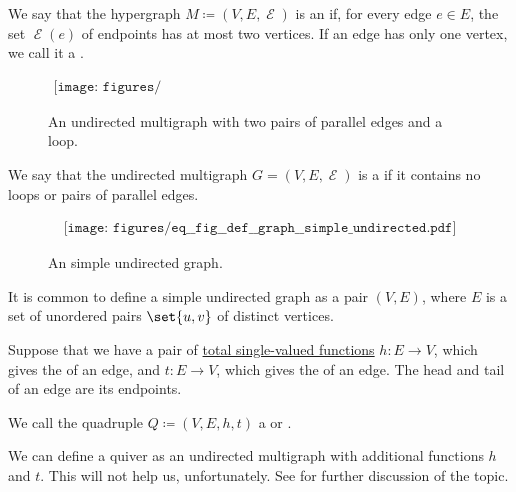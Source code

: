 \begin{definition}
\begin{thmenum}[series=def:graph]
     We say that the hypergraph \( M \coloneqq (V, E, \mscrE) \) is an  if, for every edge \( e \in E \), the set \( \mscrE(e) \) of endpoints has at most two vertices. If an edge has only one vertex, we call it a .

    \begin{figure}[h]
      \begin{equation}\label{eq:fig:def:graph/undirected_multigraph}
        \begin{aligned}
          \texttt{[image: figures/eq\_\_fig\_\_def\_\_graph\_\_undirected\_multigraph.pdf]}
        \end{aligned}
      \end{equation}
      \caption{An undirected multigraph with two pairs of parallel edges and a loop.}\label{fig:def:graph/undirected_multigraph}
    \end{figure}

     We say that the undirected multigraph \( G = (V, E, \mscrE) \) is a  if it contains no loops or pairs of parallel edges.

    \begin{figure}[h]
      \begin{equation}\label{eq:fig:def:graph/simple_undirected}
        \begin{aligned}
          \texttt{[image: figures/eq\_\_fig\_\_def\_\_graph\_\_simple\_undirected.pdf]}
        \end{aligned}
      \end{equation}
      \caption{An simple undirected graph.}\label{fig:def:graph/simple_undirected}
    \end{figure}

    It is common to define a simple undirected graph as a pair \( (V, E) \), where \( E \) is a set of unordered pairs \( \set{ u, v } \) of distinct vertices.

     Suppose that we have a pair of \hyperref[def:function]{total single-valued functions} \( h: E \to V \), which gives the  of an edge, and \( t: E \to V \), which gives the  of an edge. The head and tail of an edge are its endpoints.

    We call the quadruple \( Q \coloneqq (V, E, h, t) \) a  or .

    We can define a quiver as an undirected multigraph with additional functions \( h \) and \( t \). This will not help us, unfortunately. See  for further discussion of the topic.


\end{thmenum}
\end{definition}
